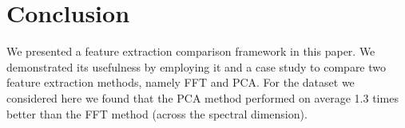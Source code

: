 \documentclass{article}
\begin{document}
% 
% 
% 


\section{Conclusion}
\label{sec:ref}
We presented a feature extraction comparison framework in this paper. We demonstrated its usefulness by employing it and a case study to compare two feature extraction methods,
namely FFT and PCA. For the dataset we considered here we found that the PCA method performed on average 1.3 times better than the FFT method (across the spectral dimension).




\end{document}
